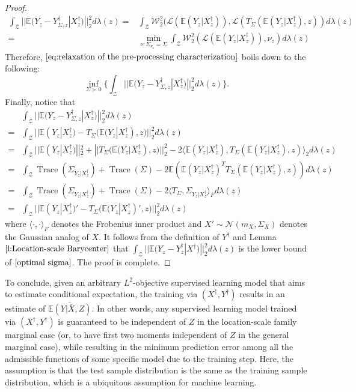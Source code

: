 \documentclass[twoside,11pt]{article}
\DeclareMathOperator{\trace}{Trace}
\begin{document}
\begin{proof}
\begin{align*}
\int_{\mathcal{Z}} ||\mathbb{E}(Y_z - Y^{\dag}_{\Sigma,z} | X^{\dag}_z)||^2_2 d\lambda(z) = & \int_{\mathcal{Z}} \mathcal{W}_2^2(\mathcal{L}(\mathbb{E}(Y_z|X^{\dag}_z)),\mathcal{L}(T_{\Sigma}(\mathbb{E}(Y_z|X^{\dag}_z),z)) d\lambda(z)\\
= & \min_{\nu: \Sigma_{\nu_z} = \Sigma} \int_{\mathcal{Z}} \mathcal{W}_2^2(\mathcal{L}(\mathbb{E}(Y_z|X^{\dag}_z)),\nu_z) d\lambda(z)
\end{align*}
Therefore, $\eqref{eq:relaxation of the pre-processing characterization}$ boils down to the following:
\begin{equation}\label{optimal sigma}
\inf_{\Sigma \succ 0} \{ \int_{\mathcal{Z}} ||\mathbb{E}(Y_z - Y^{\dag}_{\Sigma,z} | X^{\dag}_z)||^2_2 d\lambda(z) \}.
\end{equation}
Finally, notice that 
\begin{align*}
& \int_{\mathcal{Z}} ||\mathbb{E}(Y_z - Y^{\dag}_{\Sigma,z} | X^{\dag}_z)||^2_2 d\lambda(z)\\
= & \int_{\mathcal{Z}} ||\mathbb{E}(Y_z| X^{\dag}_z) -T_{\Sigma}(\mathbb{E}(Y_z| X^{\dag}_z),z) ||^2_2 d\lambda(z)\\
= & \int_{\mathcal{Z}} ||\mathbb{E}(Y_z| X^{\dag}_z)||^2_2  + ||T_{\Sigma}(\mathbb{E}(Y_z| X^{\dag}_z),z) ||^2_2 - 2 \langle \mathbb{E}(Y_z| X^{\dag}_z),  T_{\Sigma}(\mathbb{E}(Y_z| X^{\dag}_z),z)\rangle_2 d\lambda(z)\\
= & \int_{\mathcal{Z}} \trace(\Sigma_{Y_z|X^{\dag}_z})  + \trace(\Sigma) - 2 \mathbb{E}(\mathbb{E}(Y_z| X^{\dag}_z)^T T_{\Sigma}(\mathbb{E}(Y_z| X^{\dag}_z),z))  d\lambda(z)\\
= & \int_{\mathcal{Z}} \trace(\Sigma_{Y_z|X^{\dag}_z})  + \trace(\Sigma) - 2 \langle T_{\Sigma},  \Sigma_{Y_z|X^{\dag}_z} \rangle_F  d\lambda(z)\\
= & \int_{\mathcal{Z}} ||\mathbb{E}(Y_z| X^{\dag}_z)' -T_{\Sigma}(\mathbb{E}(Y_z| X^{\dag}_z)',z) ||^2_2 d\lambda(z)
\end{align*}
where $\langle \cdot,\cdot \rangle_F$ denotes the Frobenius inner product and $X' \sim \mathcal{N}(m_X,\Sigma_X)$ denotes the Gaussian analog of $X$. It follows from the definition of $Y^{\dag}$ and Lemma $\ref{l:Location-scale Barycenter}$ that $\int_{\mathcal{Z}} ||\mathbb{E}(Y_z - Y^{\dag}_z | X^{\dag})||^2_2 d\lambda(z)$ is the lower bound of $\eqref{optimal sigma}$. The proof is complete.
\end{proof}

To conclude, given an arbitrary $L^2$-objective supervised learning model that aims to estimate conditional expectation, the training via $(X^{\dag}, Y^{\dag})$ results in an estimate of $\overline{\mathbb{E}(Y| \bar{X},Z)}$. In other words, any supervised learning model trained via $(X^{\dag}, Y^{\dag})$ is guaranteed to be independent of $Z$ in the location-scale family marginal case (or, to have first two moments independent of $Z$ in the general marginal case), while resulting in the minimum prediction error among all the admissible functions of some specific model due to the training step. Here, the assumption is that the test sample distribution is the same as the training sample distribution, which is a ubiquitous assumption for machine learning.
\end{document}
